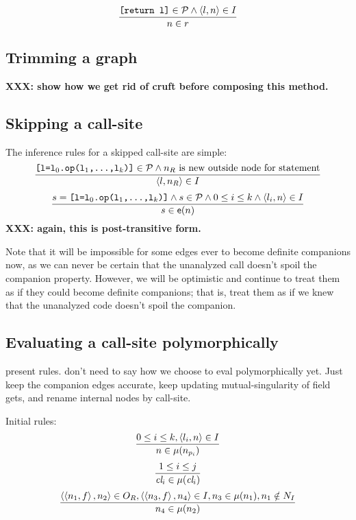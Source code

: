\documentclass[11pt,notitlepage]{article}
\newcommand{\bigvar}[1]{\ensuremath{\text{\it #1}}}
\newcommand{\func}[1]{\ensuremath{\text{\sffamily #1}}}
\begin{document}
\begin{displaymath}
\dfrac
{\text{\tt [return l]}\in\mathcal{P} \wedge
 \left\langle l,n \right\rangle\in I}
{n\in r}
\end{displaymath}

\subsection{Trimming a graph}
\textbf{XXX: show how we get rid of cruft before composing this method.}

\subsection{Skipping a call-site}
The inference rules for a skipped call-site are simple:
\begin{displaymath}
\dfrac
{\text{\tt [l=l$_0$.op(l$_1$,\ldots,l$_k$)]}\in\mathcal{P} \wedge
 n_R \text{ is new outside node for statement} }
{\left\langle l,n_R \right\rangle\in I}
\end{displaymath}
\begin{displaymath}
\dfrac
{s=\text{\tt [l=l$_0$.op(l$_1$,\ldots,l$_k$)]}\wedge s\in\mathcal{P} \wedge
 0\leq i\leq k \wedge
 \tuple{l_i,n}\in I}
{s \in \func{e}(n) }
\end{displaymath}
\textbf{XXX: again, this is post-transitive form.}

Note that it will be impossible for some edges ever to become definite
companions now, as we can never be certain that the unanalyzed call
doesn't spoil the companion property.  However, we will be optimistic
and continue to treat them as if they could become definite
companions; that is, treat them as if we knew that the unanalyzed code
doesn't spoil the companion.

\subsection{Evaluating a call-site polymorphically}

present rules.  don't need to say how we choose to eval
polymorphically yet.  Just keep the companion edges accurate,
keep updating mutual-singularity of field gets,
and rename internal nodes by call-site.

Initial rules:
\[\dfrac
{0\leq i \leq k, \left\langle l_i, n \right\rangle\in I}
{n\in\mu(n_{p_i})}
\]
\[\dfrac
{1\leq i\leq j}
{\bigvar{cl}_i \in\mu(\bigvar{cl}_i)}
\]
\[\dfrac
{\left\langle \left\langle n_1,f \right\rangle, n_2 \right\rangle\in O_R, \left\langle \left\langle n_3,f \right\rangle,n_4 \right\rangle\in I,
 n_3\in\mu(n_1), n_1\notin N_I}
{n_4 \in \mu(n_2)}
\]
\end{document}
